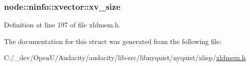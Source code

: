 \subsubsection[{\texorpdfstring{xv\+\_\+size}{xv_size}}]{ node\+::ninfo\+::xvector\+::xv\+\_\+size}\hypertarget{structnode_1_1ninfo_1_1xvector_aec898be5b4f562fa5c0d996f88b3eedd}{}\label{structnode_1_1ninfo_1_1xvector_aec898be5b4f562fa5c0d996f88b3eedd}


Definition at line 197 of file xldmem.\+h.



The documentation for this struct was generated from the following file\+:\begin{DoxyCompactItemize}
\item 
C\+:/\+\_\+dev/\+Open\+U/\+Audacity/audacity/lib-\/src/libnyquist/nyquist/xlisp/\hyperlink{xldmem_8h}{xldmem.\+h}\end{DoxyCompactItemize}
